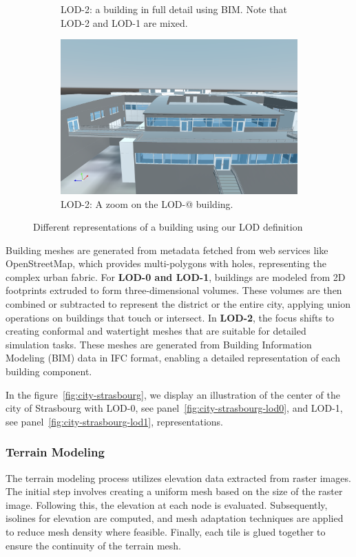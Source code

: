 \documentclass[runningheads]{llncs}
\begin{document}
\begin{figure}[htbp]
\begin{subfigure}{.4\textwidth}
  \caption{LOD-2: a building in full detail using BIM. Note that LOD-2 and LOD-1 are mixed.}
  \label{fig:building-lod2}
\end{subfigure}%
\begin{subfigure}{.4\textwidth}
  \centering
  \includegraphics[width=\linewidth]{images/buildings-lod2-zoom.png}
  \caption{LOD-2: A zoom on the LOD-@ building.}
  \label{fig:building-lod2-zoom}
\end{subfigure}
\caption{Different representations of a building using our LOD definition}
\label{fig:buildings}
\end{figure}


Building meshes are generated from metadata fetched from web services like OpenStreetMap, which provides multi-polygons with holes, representing the complex urban fabric. For \textbf{LOD-0 and LOD-1}, buildings are modeled from 2D footprints extruded to form three-dimensional volumes. These volumes are then combined or subtracted to represent the district or the entire city, applying union operations on buildings that touch or intersect. In \textbf{LOD-2}, the focus shifts to creating conformal and watertight meshes that are suitable for detailed simulation tasks. These meshes are generated from Building Information Modeling (BIM) data in IFC format, enabling a detailed representation of each building component.

In the figure~\ref{fig:city-strasbourg}, we display an illustration of the center of the city of Strasbourg with LOD-0, see panel~\ref{fig:city-strasbourg-lod0}, and LOD-1, see panel~\ref{fig:city-strasbourg-lod1}, representations.

\subsubsection{Terrain Modeling}
The terrain modeling process utilizes elevation data extracted from raster images. The initial step involves creating a uniform mesh based on the size of the raster image. Following this, the elevation at each node is evaluated. Subsequently, isolines for elevation are computed, and mesh adaptation techniques are applied to reduce mesh density where feasible. Finally, each tile is glued together to ensure the continuity of the terrain mesh.
\end{document}
